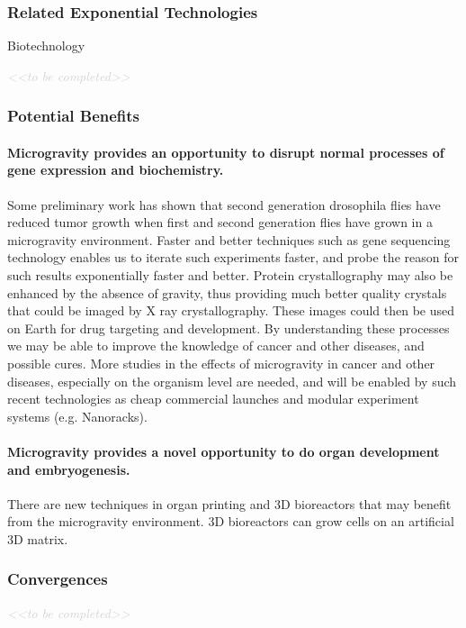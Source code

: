 \documentclass[letter,11pt]{article}
\newcommand{\todo}[1]{\textcolor{lightgray}{\textit{<<#1>>}}}
\newcommand{\tbc}{\begin{center} \todo{to be completed} \end{center}}
\newcommand{\tbcsubsubsection}[1]{ \refstepcounter{subsubsection}%
  \subsubsection*{\thesubsubsection \quad #1} \tbc}
\begin{document}
\subsubsection{Related Exponential Technologies}

Biotechnology
\tbc

\subsubsection{Potential Benefits}

\paragraph{Microgravity provides an opportunity to disrupt normal processes of gene expression and biochemistry.} Some preliminary work has shown that second generation drosophila flies have reduced tumor growth when first and second generation flies have grown in a microgravity environment. Faster and better techniques such as gene sequencing technology enables us to iterate such experiments faster, and probe the reason for such results exponentially faster and better. Protein crystallography may also be enhanced by the absence of gravity, thus providing much better quality crystals that could be imaged by X ray crystallography. These images could then be used on Earth for drug targeting and development. By understanding these processes we may be able to improve the knowledge of cancer and other diseases, and possible cures. More studies in the effects of microgravity in cancer and other diseases, especially on the organism level are needed, and will be enabled by such recent technologies as cheap commercial launches and modular experiment systems (e.g. Nanoracks).

\paragraph{Microgravity provides a novel opportunity to do organ development and embryogenesis.} There are new techniques in organ printing and 3D bioreactors that may benefit from the microgravity environment. 3D bioreactors can grow cells on an artificial 3D matrix.

\tbcsubsubsection{Convergences}
\end{document}
